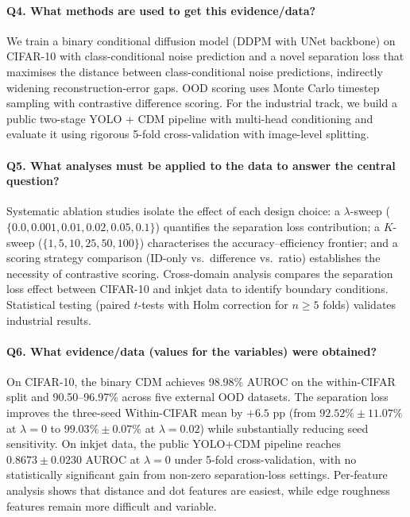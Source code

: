 \paragraph{Q4. What methods are used to get this evidence/data?}
We train a binary conditional diffusion model (DDPM with UNet backbone) on CIFAR-10 with class-conditional noise prediction and a novel separation loss that maximises the distance between class-conditional noise predictions, indirectly widening reconstruction-error gaps. OOD scoring uses Monte Carlo timestep sampling with contrastive difference scoring. For the industrial track, we build a public two-stage YOLO + CDM pipeline with multi-head conditioning and evaluate it using rigorous 5-fold cross-validation with image-level splitting.

\paragraph{Q5. What analyses must be applied to the data to answer the central question?}
Systematic ablation studies isolate the effect of each design choice: a $\lambda$-sweep ($\{0.0, 0.001, 0.01, 0.02, 0.05, 0.1\}$) quantifies the separation loss contribution; a $K$-sweep ($\{1, 5, 10, 25, 50, 100\}$) characterises the accuracy--efficiency frontier; and a scoring strategy comparison (ID-only vs.\ difference vs.\ ratio) establishes the necessity of contrastive scoring. Cross-domain analysis compares the separation loss effect between CIFAR-10 and inkjet data to identify boundary conditions. Statistical testing (paired $t$-tests with Holm correction for $n \geq 5$ folds) validates industrial results.

\paragraph{Q6. What evidence/data (values for the variables) were obtained?}
On CIFAR-10, the binary CDM achieves 98.98\% AUROC on the within-CIFAR split and 90.50--96.97\% across five external OOD datasets. The separation loss improves the three-seed Within-CIFAR mean by $+6.5$ pp (from $92.52\% \pm 11.07\%$ at $\lambda{=}0$ to $99.03\% \pm 0.07\%$ at $\lambda{=}0.02$) while substantially reducing seed sensitivity. On inkjet data, the public YOLO+CDM pipeline reaches $0.8673 \pm 0.0230$ AUROC at $\lambda{=}0$ under 5-fold cross-validation, with no statistically significant gain from non-zero separation-loss settings. Per-feature analysis shows that distance and dot features are easiest, while edge roughness features remain more difficult and variable.

